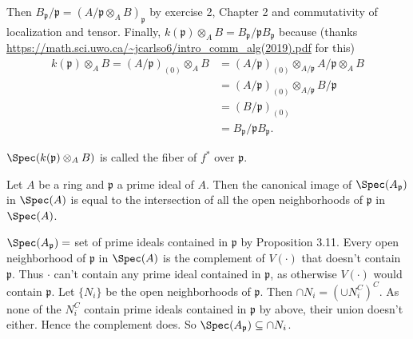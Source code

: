 \documentclass[a4paper]{exam}
\begin{document}
\begin{questions}
\begin{enumerate}
\begin{solution}
	Then $B_{\mathfrak{p}} / \mathfrak{p} = (A / \mathfrak{p} \otimes_{A} B)_{\mathfrak{p}}$ by exercise 2, Chapter 2 and commutativity of localization and tensor.
	Finally, $k(\mathfrak{p}) \otimes _A B = B_{\mathfrak{p}} / \mathfrak{p} B_{\mathfrak{p}} $ because (thanks \url{https://math.sci.uwo.ca/~jcarlso6/intro_comm_alg(2019).pdf} for this)
	\begin{align*}
		k(\mathfrak{p}) \otimes _A B = (A / \mathfrak{p})_{(0)} \otimes_A B &= (A / \mathfrak{p})_{(0)} \otimes _{A / \mathfrak{p}} A / \mathfrak{p} \otimes _A B \tag{Proposition 3.5}\\
		&= (A / \mathfrak{p})_{(0)} \otimes _{A / \mathfrak{p}} B / \mathfrak{p} \tag{Exercise 2, Chapter 2}\\
		&= (B / \mathfrak{p})_{(0)} \tag{Proposition 3.5}\\
		&= B_{\mathfrak{p}} / \mathfrak{p}B_{\mathfrak{p}}
	.\end{align*}

\end{solution}
$\Spec(k(\mathfrak{p}) \otimes_A B) $ is called the fiber of $f^\ast $ over $\mathfrak{p} $.
\end{enumerate}

\question Let $A $ be a ring and $\mathfrak{p} $ a prime ideal of $A $. Then the canonical image of $\Spec(A_{\mathfrak{p}}) $ in $\Spec(A) $ is equal to the intersection of all the open neighborhoods of $\mathfrak{p} $ in $\Spec(A) $.
\begin{solution}
	$\Spec(A_{\mathfrak{p}}) = $ set of prime ideals contained in $\mathfrak{p} $ by Proposition 3.11.
	Every open neighborhood of $\mathfrak{p} $ in $\Spec(A) $ is the complement of $V(\cdot) $ that doesn't contain $\mathfrak{p} $.
	Thus $\cdot $ can't contain any prime ideal contained in $\mathfrak{p} $, as otherwise $V(\cdot) $ would contain $\mathfrak{p} $.
	Let $\{N_i\}$ be the open neighborhoods of $\mathfrak{p} $.
	Then $\cap N_i = (\cup N_i^C)^C $.
	As none of the $N_i^C$ contain prime ideals contained in $\mathfrak{p} $ by above, their union doesn't either.
	Hence the complement does.
	So $\Spec(A_{\mathfrak{p}}) \subseteq \cap N_i $.


\end{solution}
\end{questions}
\end{document}
